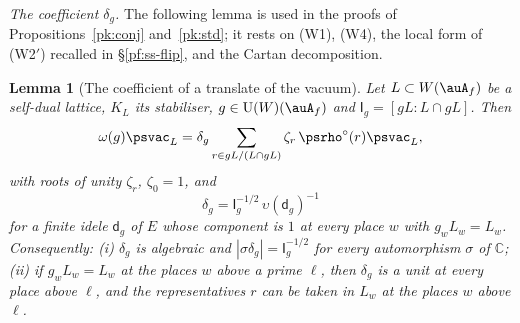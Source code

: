 \documentclass[10pt]{amsart}
\newtheorem{lemma}[theorem]{Lemma}
\theoremstyle{definition}
\theoremstyle{remark}
\newcommand{\C}{\mathbb C}
\providecommand{\auU}{\mathrm U}
\begin{document}
\emph{The coefficient $\delta_g$.} The following lemma is used in the proofs of Propositions~\ref{pk:conj} and~\ref{pk:std}; it rests on (W1), (W4), the local form of (W2$'$) recalled in \S\ref{pf:ss-flip}, and the Cartan decomposition.

\begin{lemma}[The coefficient of a translate of the vacuum]\label{pf:delta}
Let $L\subset W(\auA_f)$ be a self-dual lattice, $K_L$ its stabiliser, $g\in\auU(W)(\auA_f)$ and
$\mathsf I_g=[gL:L\cap gL]$. Then
\[
\omega(g)\psvac_L=\delta_g\sum_{r\in gL/(L\cap gL)}\zeta_r\,\psrho^\circ(r)\psvac_L ,
\]
with roots of unity $\zeta_r$, $\zeta_0=1$, and
\[
\delta_g=\mathsf I_g^{-1/2}\,\upsilon(\mathsf d_g)^{-1}
\]
for a finite idele $\mathsf d_g$ of $E$ whose component is $1$ at every place $w$ with $g_wL_w=L_w$.
Consequently: \textup{(i)} $\delta_g$ is algebraic and $|\sigma\delta_g|=\mathsf I_g^{-1/2}$ for every
automorphism $\sigma$ of $\C$; \textup{(ii)} if $g_wL_w=L_w$ at the places $w$ above a prime $\ell$, then
$\delta_g$ is a unit at every place above $\ell$, and the representatives $r$ can be taken in $L_w$ at
the places $w$ above $\ell$.
\end{lemma}
\end{document}
